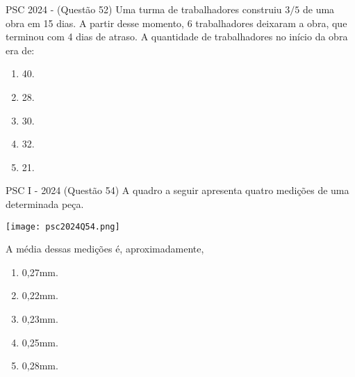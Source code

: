 \documentclass[aspectratio=169]{beamer}
\newif\ifusarcorvermelha
\newcommand{\vermelho}[1]{%
    \ifusarcorvermelha
        {\color{red}#1}%
    \else
        #1%
    \fi
}
\begin{document}
    \begin{frame}{PSC 2024 - (Questão 52)}
        Uma turma de trabalhadores construiu ${3}/{5}$ de uma obra em 15 dias. A partir desse momento, 6 trabalhadores deixaram a obra, que terminou com 4 dias de atraso. A quantidade de trabalhadores no início da obra era de:

            \begin{enumerate}[a]
                \item 40.
                \item 28.
                \item 30.
                \item 32.
                \item \vermelho{21.} %
            \end{enumerate}
    
    \end{frame}


    \begin{frame}{PSC I - 2024 (Questão 54)}
        A quadro a seguir apresenta quatro medições de uma determinada peça. 

        \begin{center}
            \texttt{[image: psc2024Q54.png]}
        \end{center} A média dessas medições é, aproximadamente,
        
            \begin{enumerate}[a]
                \item 0,27mm.
                \item 0,22mm.
                \item 0,23mm.
                \item \vermelho{0,25mm.} %
                \item 0,28mm.
            \end{enumerate}
    
    \end{frame}
\end{document}

